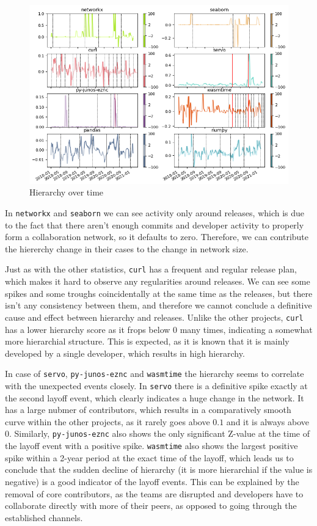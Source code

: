 \begin{figure}
    \centering
    \includegraphics[width=\textwidth]{figures/qualitative/hierarchy/hierarchy_all.png}
    \caption{Hierarchy over time}
    \label{fig:hierarchy_all}
\end{figure}

In \texttt{networkx} and \texttt{seaborn} we can see activity only around releases, which is due to the fact that there aren't enough commits and developer activity to properly form a collaboration network, so it defaults to zero. Therefore, we can contribute the hiererchy change in their cases to the change in network size.

Just as with the other statistics, \texttt{curl} has a frequent and regular release plan, which makes it hard to observe any regularities around releases. We can see some spikes and some troughs coincidentally at the same time as the releases, but there isn't any consistency between them, and therefore we cannot conclude a definitive cause and effect between hierarchy and releases. Unlike the other projects, \texttt{curl} has a lower hierarchy score as it frops below $0$ many times, indicating a somewhat more hierarchial structure. This is expected, as it is known that it is mainly developed by a single developer, which results in high hierarchy.

In case of \texttt{servo}, \texttt{py-junos-eznc} and \texttt{wasmtime} the hierarchy seems to correlate with the unexpected events closely. In \texttt{servo} there is a definitive spike exactly at the second layoff event, which clearly indicates a huge change in the network. It has a large nubmer of contributors, which results in a comparatively smooth curve within the other projects, as it rarely goes above $0.1$ and it is always above $0$. Similarly, \texttt{py-junos-eznc} also shows the only significant Z-value at the time of the layoff event with a positive spike. \texttt{wasmtime} also shows the largest positive spike within a 2-year period at the exact time of the layoff, which leads us to conclude that the sudden decline of hierarchy (it is more hierarchial if the value is negative) is a good indicator of the layoff events. This can be explained by the removal of core contributors, as the teams are disrupted and developers have to collaborate directly with more of their peers, as opposed to going through the established channels.

